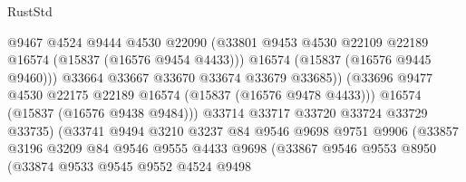 \begin{lexlean}{RustStd}
\begin{coremodule}
                                      @9467
                                      @4524
                                      @9444
                                      @4530
                                      @22090
                                      (@33801
                                        @9453
                                        @4530
                                        @22109
                                        @22189
                                        @16574
                                        (@15837 (@16576 @9454 @4433)))
                                      @16574
                                      (@15837 (@16576 @9445 @9460)))
                                    @33664
                                    @33667
                                    @33670
                                    @33674
                                    @33679
                                    @33685))
                                (@33696
                                  @9477
                                  @4530
                                  @22175
                                  @22189
                                  @16574
                                  (@15837 (@16576 @9478 @4433)))
                                @16574
                                (@15837 (@16576 @9438 @9484)))
                              @33714
                              @33717
                              @33720
                              @33724
                              @33729
                              @33735)
                            (@33741
                              @9494
                              @3210
                              @3237
                              @84
                              @9546
                              @9698
                              @9751
                              @9906
                              (@33857
                                @3196
                                @3209
                                @84
                                @9546
                                @9555
                                @4433
                                @9698
                                (@33867
                                  @9546
                                  @9553
                                  @8950
                                  (@33874
                                    @9533
                                    @9545
                                    @9552
                                    @4524
                                    @9498

\end{coremodule}
\end{lexlean}
